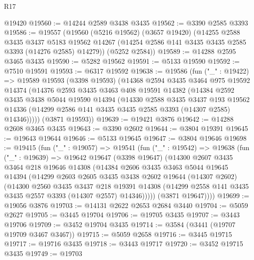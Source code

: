 \begin{lexlean}{R17}
\begin{coremodule}
    @19420
@19560 := @14244 @2589 @3438 @3435
@19562 := @3390 @2585 @3393
@19586 := @19557
    (@19560
      (@5216 @19562)
      (@3657 @19420)
      (@14255
        @2588
        @3435
        @3437
        @5183
        @19562
        @14267
        (@14254 @2586 @141 @3435 @3435 @2585 @3393 (@14276 @2585) @14279))
      (@5252 @2584))
@19589 := @14288 @2595 @3465 @3435
@19590 := @5282 @19562
@19591 := @5133 @19590
@19592 := @7510 @19591
@19593 := @6317 @19592
@19638 := @19586
    (fun ("_" : @19422) =>
    @19589
      @19593
      (@3398 @19593)
      (@14368
        @2594
        @3435
        @3464
        @975
        @19592
        @14374
        (@14376
          @2593
          @3435
          @3463
          @408
          @19591
          @14382
          (@14384
            @2592
            @3435
            @3438
            @5044
            @19590
            @14394
            (@14330
              @2588
              @3435
              @3437
              @193
              @19562
              @14336
              (@14299 @2586 @141 @3435 @3435 @2585 @3393 (@14307 @2585) @14346)))))
      (@3871 @19593))
@19639 := @19421 @3876
@19642 := @14288 @2608 @3465 @3435
@19643 := @3390 @2602
@19644 := @3804 @19391
@19645 := @19643 @19644
@19646 := @5133 @19645
@19647 := @3804 @19646
@19698 := @19415
    (fun ("_" : @19057) =>
    @19541
      (fun ("_" : @19542) =>
      @19638
        (fun ("_" : @19639) =>
        @19642
          @19647
          (@3398 @19647)
          (@14300
            @2607
            @3435
            @3464
            @218
            @19646
            @14308
            (@14384
              @2606
              @3435
              @3463
              @5044
              @19645
              @14394
              (@14299
                @2603
                @2605
                @3435
                @3438
                @2602
                @19644
                (@14307 @2602)
                (@14300
                  @2560
                  @3435
                  @3437
                  @218
                  @19391
                  @14308
                  (@14299 @2558 @141 @3435 @3435 @2557 @3393 (@14307 @2557) @14346)))))
          (@3871 @19647))))
@19699 := @19056 @3876
@19703 := @14131 @2622 @2653 @2684 @3440
@19704 := @5059 @2627
@19705 := @3445 @19704
@19706 := @19705 @3435
@19707 := @3443 @19706
@19709 := @3452 @19704 @3435
@19714 := @3584 (@3441 (@19707 @19709 @3467 @3467))
@19715 := @5059 @2658
@19716 := @3445 @19715
@19717 := @19716 @3435
@19718 := @3443 @19717
@19720 := @3452 @19715 @3435
@19749 := @19703

\end{coremodule}
\end{lexlean}
